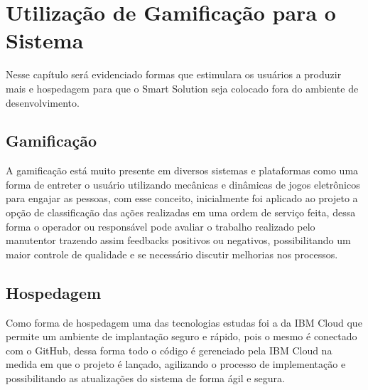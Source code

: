 \chapter{Utilização de Gamificação para o Sistema }
Nesse capítulo será evidenciado formas que estimulara os usuários a produzir mais e hospedagem para que o Smart Solution seja colocado fora do ambiente de desenvolvimento.
\section{Gamificação}
A gamificação está muito presente em diversos sistemas e plataformas como uma forma de entreter o usuário utilizando mecânicas e dinâmicas de jogos eletrônicos para engajar as pessoas, com esse conceito, inicialmente foi aplicado ao projeto a opção de classificação das ações realizadas em uma ordem de serviço feita, dessa forma o operador ou responsável pode avaliar o trabalho realizado pelo manutentor trazendo assim feedbacks positivos ou negativos, possibilitando um maior controle de qualidade e se necessário discutir melhorias nos processos.



\section{Hospedagem}
Como forma de hospedagem uma das tecnologias estudas foi a da IBM Cloud que permite um ambiente de implantação seguro e rápido, pois o mesmo é conectado com o GitHub, dessa forma todo o código é gerenciado pela IBM Cloud na medida em que o projeto é lançado, agilizando o processo de implementação e possibilitando as atualizações do sistema de forma ágil e segura.
